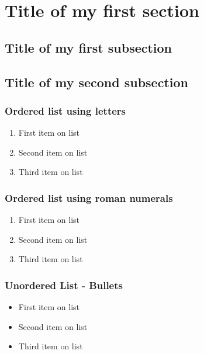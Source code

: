 \documentclass[a4paper,10pt]{article}
\begin{document}

\section{Title of my first section}
    
\subsection{Title of my first subsection}
 \subsection{Title of my second subsection}
    
    \subsubsection{Ordered list using letters} 
        \begin{enumerate}[label=(\alph*)]
            \item First item on list
            \item Second item on list
            \item Third item on list
        \end{enumerate}
        
    \subsubsection{Ordered list using roman numerals} 
      \begin{enumerate}[label=(\roman*)]
            \item First item on list
            \item Second item on list
            \item Third item on list
        \end{enumerate}
        
     \subsubsection{Unordered List - Bullets} 
      \begin{itemize}
            \item First item on list
            \item Second item on list
            \item Third item on list
        \end{itemize}     
    
\end{document}

